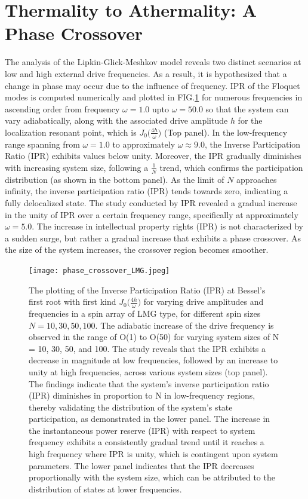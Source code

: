 \documentclass[%
reprint,
superscriptaddress,
amsmath,amssymb,
aps,
prb,
showkeys,
]{revtex4-2}
\begin{document}
	\section{\label{sec:level5}Thermality to Athermality: A Phase Crossover}
	The analysis of the Lipkin-Glick-Meshkov model reveals two distinct scenarios at low and high external drive frequencies. As a result, it is hypothesized that a change in phase may occur due to the influence of frequency. IPR of the Floquet modes is computed numerically and plotted in FIG.\ref{fig:phase_transition} for numerous frequencies in ascending order from frequency $\omega = 1.0$ upto $\omega=50.0$ so that the system can vary adiabatically, along with the associated drive amplitude $h$ for the localization resonant point, which is $J_0\big(\frac{4h}{\omega}\big)$ (Top panel). In the low-frequency range spanning from $\omega = 1.0$ to approximately $\omega \approx 9.0$, the Inverse Participation Ratio (IPR) exhibits values below unity. Moreover, the IPR gradually diminishes with increasing system size, following a $\frac{1}{N}$ trend, which confirms the participation distribution (as shown in the bottom panel). As the limit of $N$ approaches infinity, the inverse participation ratio (IPR) tends towards zero, indicating a fully delocalized state. The study conducted by IPR revealed a gradual increase in the unity of IPR over a certain frequency range, specifically at approximately $\omega = 5.0$. The increase in intellectual property rights (IPR) is not characterized by a sudden surge, but rather a gradual increase that exhibits a phase crossover. As the size of the system increases, the crossover region becomes smoother.
	
	\begin{figure}[!ht]
		\centering
		\texttt{[image: phase\_crossover\_LMG.jpeg]}
		\caption{The plotting of the Inverse Participation Ratio (IPR) at Bessel's first root with first kind $J_0\Big(\frac{4h}{\omega}\Big)$ for varying drive amplitudes and frequencies in a spin array of LMG type, for different spin sizes $N = 10,30,50,100$. The adiabatic increase of the drive frequency is observed in the range of O(1) to O(50) for varying system sizes of N = 10, 30, 50, and 100. The study reveals that the IPR exhibits a decrease in magnitude at low frequencies, followed by an increase to unity at high frequencies, across various system sizes (top panel).  The findings indicate that the system's inverse participation ratio (IPR) diminishes in proportion to N in low-frequency regions, thereby validating the distribution of the system's state participation, as demonstrated in the lower panel. The increase in the instantaneous power reserve (IPR) with respect to system frequency exhibits a consistently gradual trend until it reaches a high frequency where IPR is unity, which is contingent upon system parameters. The lower panel indicates that the IPR decreases proportionally with the system size, which can be attributed to the distribution of states at lower frequencies.}
		\label{fig:phase_transition}
	\end{figure}
\end{document}
